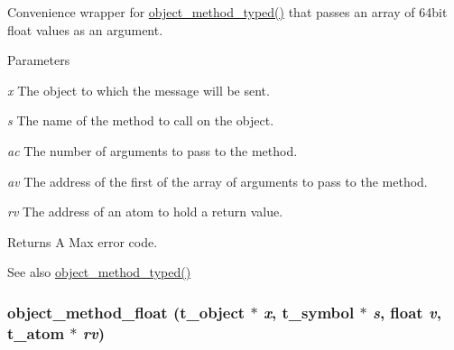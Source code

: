 Convenience wrapper for \hyperlink{group__obj_ga443dee482af22e0fe83e68955d367226}{object\_\-method\_\-typed()} that passes an array of 64bit float values as an argument. 
\begin{DoxyParams}{Parameters}
\item[{\em x}]The object to which the message will be sent. \item[{\em s}]The name of the method to call on the object. \item[{\em ac}]The number of arguments to pass to the method. \item[{\em av}]The address of the first of the array of arguments to pass to the method. \item[{\em rv}]The address of an atom to hold a return value.\end{DoxyParams}
\begin{DoxyReturn}{Returns}
A Max error code. 
\end{DoxyReturn}
\begin{DoxySeeAlso}{See also}
\hyperlink{group__obj_ga443dee482af22e0fe83e68955d367226}{object\_\-method\_\-typed()} 
\end{DoxySeeAlso}
\hypertarget{group__obj_gabd57e5e8ce873c5aa12dfc60db6cb6f1}{
\subsubsection[{object\_\-method\_\-float}]{ object\_\-method\_\-float ({\bf t\_\-object} $\ast$ {\em x}, \/  {\bf t\_\-symbol} $\ast$ {\em s}, \/  float {\em v}, \/  {\bf t\_\-atom} $\ast$ {\em rv})}}
\label{group__obj_gabd57e5e8ce873c5aa12dfc60db6cb6f1}


